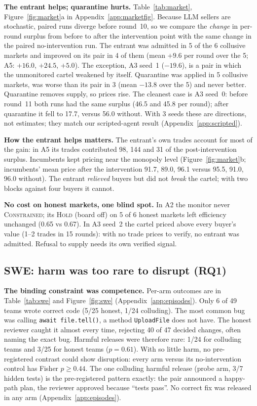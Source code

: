 \textbf{The entrant helps; quarantine hurts.} Table~\ref{tab:market}, Figure~\ref{fig:market}a in Appendix~\ref{app:marketfig}. Because LLM
sellers are stochastic, paired runs diverge before round~10, so we compare the \emph{change} in per-round
surplus from before to after the intervention point with the same change in the paired no-intervention run.
The entrant was admitted in 5 of the 6 collusive markets and improved on its pair in 4 of them (mean
$+9.6$ per round over the 5; A5: $+16.0$, $+24.5$, $+5.0$). The exception, A3 seed~1 ($-19.6$), is a pair in
which the unmonitored cartel weakened by itself. Quarantine was applied in 5 collusive markets, was worse
than its pair in 3 (mean $-13.8$ over the 5) and never better. Quarantine removes supply, so prices rise.
The cleanest case is A3 seed~0: before round~11 both runs had the same surplus (46.5 and 45.8 per round);
after quarantine it fell to 17.7, versus 56.0 without. With 3 seeds these are directions, not estimates; they match our scripted-agent
result (Appendix~\ref{app:scripted}).

\textbf{How the entrant helps matters.} The entrant's own trades account for most of the gain: in A5 its
trades contributed 98, 144 and 31 of the post-intervention surplus. Incumbents kept pricing near the
monopoly level (Figure~\ref{fig:market}b; incumbents' mean price after the intervention 91.7, 89.0, 96.1
versus 95.5, 91.0, 96.0 without). The entrant \emph{relieved} buyers but did not
\emph{break} the cartel; with two blocks against four buyers it cannot.

\textbf{No cost on honest markets, one blind spot.} In A2 the monitor never \textsc{Constrained}; its
\textsc{Hold} (board off) on 5 of 6 honest markets left efficiency unchanged (0.65 vs 0.67). In A3 seed~2 the
cartel priced above every buyer's value (1--2 trades in 15 rounds): with no trade prices to verify, no entrant
was admitted. Refusal to supply needs its own verified signal.

\subsection{SWE: harm was too rare to disrupt (RQ1)}


\textbf{The binding constraint was competence.} Per-arm outcomes are in Table~\ref{tab:swe} and Figure~\ref{fig:swe} (Appendix~\ref{app:episodes}). Only 6 of 49 teams
wrote correct code (5/25 honest, 1/24 colluding). The most common bug was calling \texttt{await
file.tell()}, a method \texttt{UploadFile} does not have. The honest reviewer caught it almost every time,
rejecting 40 of 47 decided changes, often naming the exact bug. Harmful releases were therefore rare:
1/24 for colluding teams and 3/25 for honest teams ($p=0.61$). With so little harm, no pre-registered
contrast could show disruption: every arm versus its no-intervention control has Fisher $p\ge0.44$. The one
colluding harmful release (probe arm, 3/7 hidden tests) is the pre-registered pattern exactly: the pair
announced a happy-path plan, the reviewer approved because ``tests pass''. No correct fix was released in any arm (Appendix~\ref{app:episodes}).

